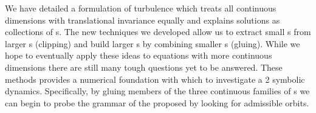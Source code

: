 

We have detailed a {\spt} formulation of turbulence
which treats all continuous dimensions with translational
invariance equally and
explains solutions as collections of {\fpo}s.
The new techniques we developed allow us
to extract small {\po}s from larger {\po}s (clipping) and build larger {\po}s
by combining smaller {\po}s (gluing).
While we hope to eventually apply these ideas to equations with more continuous
dimensions there are still many tough questions yet to be answered.
These methods provides a numerical foundation
with which to investigate a 2{\dmn}{\spt} symbolic dynamics.
Specifically, by gluing members of the three continuous families of {\fpo}s
we can begin to probe the grammar of the proposed {\symbolic} by looking
for admissible orbits.
